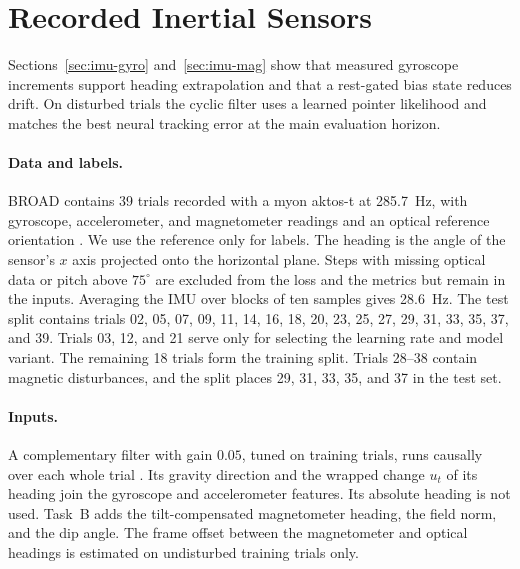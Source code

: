 \section{Recorded Inertial Sensors}
\label{app:imu}
Sections~\ref{sec:imu-gyro} and~\ref{sec:imu-mag} show that measured
gyroscope increments support heading extrapolation and that a rest-gated
bias state reduces drift. On disturbed trials the cyclic filter uses a
learned pointer likelihood and matches the best neural tracking error at
the main evaluation horizon.

\paragraph{Data and labels.}
BROAD contains 39 trials recorded with a myon aktos-t at 285.7~Hz, with
gyroscope, accelerometer, and magnetometer readings and an optical
reference orientation
\citep{laidig2021broad}. We use the reference only for labels. The heading is
the angle of the sensor's $x$ axis projected onto the horizontal plane. Steps
with missing optical data or pitch above $75^\circ$ are excluded from the loss
and the metrics but remain in the inputs. Averaging the IMU over blocks of ten
samples gives 28.6~Hz. The test split contains trials 02, 05, 07, 09, 11,
14, 16, 18, 20, 23, 25, 27, 29, 31, 33, 35, 37, and 39. Trials 03, 12, and 21
serve only for selecting the learning rate and model variant. The remaining
18 trials form the training split. Trials 28--38 contain magnetic disturbances,
and the split places 29, 31, 33, 35, and 37 in the test set.

\paragraph{Inputs.}
A complementary filter with gain $0.05$, tuned on training trials, runs
causally over each whole trial \citep{mahony2008complementary}. Its gravity
direction and the wrapped change $u_t$ of its heading join the gyroscope and
accelerometer features. Its absolute heading is not used. Task~B adds the
tilt-compensated magnetometer heading, the field norm, and the dip angle. The
frame offset between the magnetometer and optical headings is estimated on
undisturbed training trials only.


